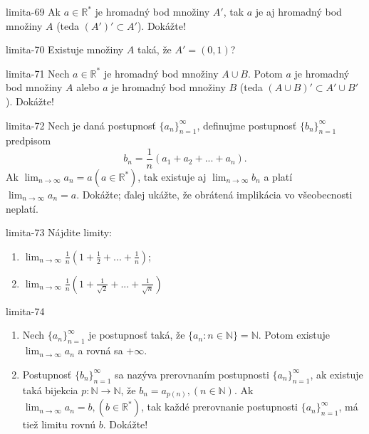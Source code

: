 \begin{defproblem}{limita-69}
Ak $a \in \mathbb{R^*}$ je hromadný bod množiny $A'$, tak $a$ je aj hromadný bod množiny $A$ (teda $(A')' \subset A'$). Dokážte!
\end{defproblem}

\begin{defproblem}{limita-70}
Existuje množiny $A$ taká, že $A'=(0,1)$?
\end{defproblem}

\begin{defproblem}{limita-71}
Nech $a \in \mathbb{R^*}$ je hromadný bod množiny $A \cup B$. Potom $a$ je hromadný bod množiny $A$ alebo $a$ je hromadný bod množiny $B$ (teda $(A \cup B)' \subset A' \cup B'$). Dokážte!
\end{defproblem}

\begin{defproblem}{limita-72}
Nech je daná postupnosť ${\{a_n\}}_{n=1}^\infty$, definujme postupnosť ${\{b_n\}}_{n=1}^\infty$ predpisom 
$$b_n=\frac{1}{n}(a_1+a_2+...+a_n).$$
Ak $\lim_{n \rightarrow \infty} a_n=a (a \in \mathbb{R^*})$, tak existuje aj $\lim_{n \rightarrow \infty} b_n$ a platí $\lim_{n \rightarrow \infty} a_n=a$. Dokážte; ďalej ukážte, že obrátená implikácia vo všeobecnosti neplatí.
\end{defproblem}

\begin{defproblem}{limita-73}
Nájdite limity:
\begin{enumerate}
\item $\lim_{n \rightarrow \infty} \frac{1}{n}(1+\frac{1}{2}+...+\frac{1}{n})$;
\item $\lim_{n \rightarrow \infty} \frac{1}{n}(1+\frac{1}{\sqrt{2}}+...+\frac{1}{\sqrt{n}})$
\end{enumerate}
\end{defproblem}

\begin{defproblem}{limita-74}
\begin{enumerate}
\item Nech ${\{a_n\}}_{n=1}^\infty$ je postupnosť taká, že $\{ a_n: n \in \mathbb{N} \}=\mathbb{N}$. Potom existuje $\lim_{n \rightarrow \infty} a_n$ a rovná sa $+\infty$.
\item Postupnosť ${\{b_n\}}_{n=1}^\infty$ sa nazýva prerovnaním postupnosti ${\{a_n\}}_{n=1}^\infty$, ak existuje taká bijekcia $p: \mathbb{N} \rightarrow \mathbb{N}$, že $b_n=a_{p(n)},(n \in \mathbb{N})$. Ak $\lim_{n \rightarrow \infty} a_n=b,(b \in \mathbb{R^*})$, tak každé prerovnanie postupnosti ${\{a_n\}}_{n=1}^\infty$, má tiež limitu rovnú $b$. Dokážte!
\end{enumerate}
\end{defproblem}

